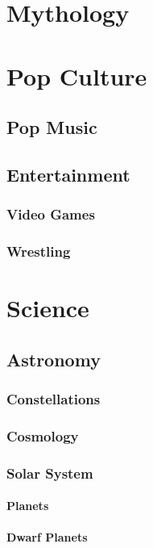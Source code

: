 \documentclass[12pt]{book}
\begin{document}
\chapter{Mythology}




	

	

		
	
\chapter{Pop Culture}
	\section{Pop Music}
	\section{Entertainment}
		\subsection{Video Games}
		\subsection{Wrestling}



\chapter{Science}
	\section{Astronomy}
		\subsection{Constellations}
		\subsection{Cosmology}
		\subsection{Solar System}
			\subsubsection{Planets}
			\subsubsection{Dwarf Planets}
\end{document}
